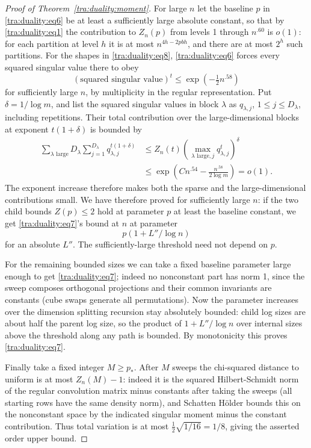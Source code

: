 \begin{proof}[Proof of Theorem~\ref{tra:duality:moment}]
For large \(n\) let the baseline \(p\) in \eqref{tra:duality:eq6} be at least a sufficiently large absolute constant, so that by \eqref{tra:duality:eq1} the contribution to \(Z_n(p)\) from levels 1 through \(n^{.60}\) is \(o(1)\): for each partition at level \(h\) it is at most
\(n^{4h-2pbh}\), and there are at most \(2^h\) such partitions. For the shapes in \eqref{tra:duality:eq8}, \eqref{tra:duality:eq6} forces every squared singular value there to obey
\[
                      (\text{squared singular value})^t
                         \le \exp(-\tfrac12 n^{.58})
\]
for sufficiently large \(n\), by multiplicity in the regular representation. Put $\delta=1/\log m$, and list the squared singular values in
block $\lambda$ as $q_{\lambda,j}$, $1\le j\le D_\lambda$,
including repetitions. Their total contribution over the
large-dimensional blocks at exponent $t(1+\delta)$ is bounded by
\[
 \begin{aligned}
 \sum_{\lambda\text{ large}}D_\lambda
       \sum_{j=1}^{D_\lambda}q_{\lambda,j}^{t(1+\delta)}
 &\le Z_n(t)\left(\max_{\lambda\text{ large},j}q_{\lambda,j}^t\right)^\delta\\
 &\le\exp\!\left(Cn^{.54}-\frac{n^{.58}}{2\log m}\right)=o(1).
 \end{aligned}
\]
The exponent increase therefore makes both the sparse and the
large-dimensional contributions small. We have therefore proved for sufficiently large \(n\): if the two child bounds \(Z(p)\le 2\) hold at parameter \(p\) at least the baseline constant, we get \eqref{tra:duality:eq7}'s bound at \(n\) at parameter
\[
                              p(1+L''/\log n)
\]
for an absolute \(L''\). The sufficiently-large threshold need not depend on \(p\).

For the remaining bounded sizes we can take a fixed baseline parameter large enough to get \eqref{tra:duality:eq7}; indeed no nonconstant part has norm 1, since the sweep composes orthogonal projections and their common invariants are constants (cube swaps generate all permutations). Now the parameter increases over the dimension splitting recursion stay absolutely bounded: child log sizes are about half the parent log size, so the product of \(1+L''/\log n\) over internal sizes above the threshold along any path is bounded. By monotonicity this proves \eqref{tra:duality:eq7}.

Finally take a fixed integer \(M\ge p_*\). After \(M\) sweeps the chi-squared distance to uniform is at most \(Z_n(M)-1\): indeed it is the squared Hilbert-Schmidt norm of the regular convolution matrix minus constants after taking the sweeps (all starting rows have the same density norm), and Schatten Hölder bounds this on the nonconstant space by the indicated singular moment minus the constant contribution. Thus total variation is at most $\tfrac12\sqrt{1/16}=1/8$, giving the asserted order upper bound.
\end{proof}
